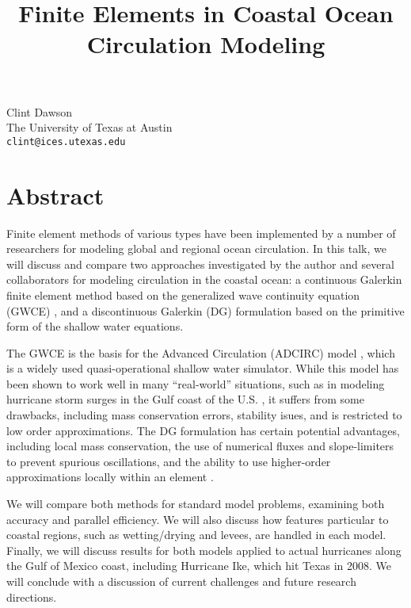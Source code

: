 \title{Finite Elements in Coastal Ocean Circulation Modeling}
\author{} \institute{}
\maketitle

\begin{center}
{\large Clint Dawson}\\
The University of Texas at Austin\\
{\tt clint@ices.utexas.edu}
\end{center}

\section*{Abstract}
Finite element methods of various types have been implemented by a number of researchers for modeling global and regional ocean circulation.  In this talk, we will discuss and compare two approaches investigated by the author and several collaborators for modeling circulation in the coastal ocean: a continuous Galerkin finite element method based on the generalized wave continuity equation (GWCE) \cite{LynchGray79}, and a discontinuous Galerkin (DG) formulation \cite{ad1,kub} based on the primitive form of the shallow water equations.

The GWCE is the basis for the Advanced Circulation (ADCIRC) model \cite{Luettich92}, which is a widely used quasi-operational shallow water simulator.    While this model has been shown to work well in many ``real-world'' situations, such as in modeling hurricane storm surges in the Gulf coast of the U.S. \cite{bunya,dietrich,MWR-Gustav}, it suffers from some drawbacks, including mass conservation errors, stability isues, and is restricted to low order approximations.  The DG formulation has certain potential advantages, including local mass conservation, the use of numerical fluxes and slope-limiters to prevent spurious oscillations, and the ability to use higher-order approximations locally within an element \cite{kub-p}.

We will compare both methods for standard model problems, examining both accuracy and parallel efficiency.  We will also discuss how features particular to coastal regions, such as wetting/drying and levees, are handled in each model. Finally, we will discuss results for both models  applied to actual hurricanes along the Gulf of Mexico coast, including Hurricane Ike, which hit Texas in 2008.  We will conclude with a discussion of current challenges and future research directions.

